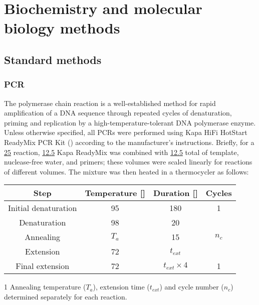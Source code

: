 \section{Biochemistry and molecular biology methods}


\subsection{Standard methods}

\subsubsection{PCR}
\label{sec:methods_molec_standard_pcr}

The polymerase chain reaction is a well-established method for rapid amplification of a DNA sequence through repeated cycles of denaturation, priming and replication by a high-temperature-tolerant DNA polymerase enzyme. %
Unless otherwise specified, all PCRs were performed using  Kapa HiFi HotStart ReadyMix PCR Kit () according to the manufacturer's instructions. Briefly, for a \ul{25} reaction, \ul{12.5} Kapa ReadyMix was combined with \ul{12.5} total of template, nuclease-free water, and primers; these volumes were scaled linearly for reactions of different volumes. The mixture was then heated in a thermocycler as follows:

\begin{center}
\begin{threeparttable}
\begin{tabular}{cccc}\toprule
\textbf{Step} & \textbf{Temperature [\degC{}]} & \textbf{Duration [\secs{}]} & \textbf{Cycles}\\\midrule
Initial denaturation & 95 & 180 & 1 \\\midrule
Denaturation & 98 & 20 & \multirow{3}{*}{$n_c$\tnote{1}}\\
Annealing & $T_a$\tnote{1} \tnote{} & 15 & \\
Extension & 72 & $t_{ext}$\tnote{1} & \\\midrule
Final extension & 72 & $t_{ext} \times 4$\tnote{1} & 1\\
\bottomrule\end{tabular}
\begin{tablenotes}
\item[1] Annealing temperature ($T_a$), extension time ($t_{ext}$) and cycle number ($n_c$) determined separately for each reaction.
\end{tablenotes}
\end{threeparttable}
\end{center}

